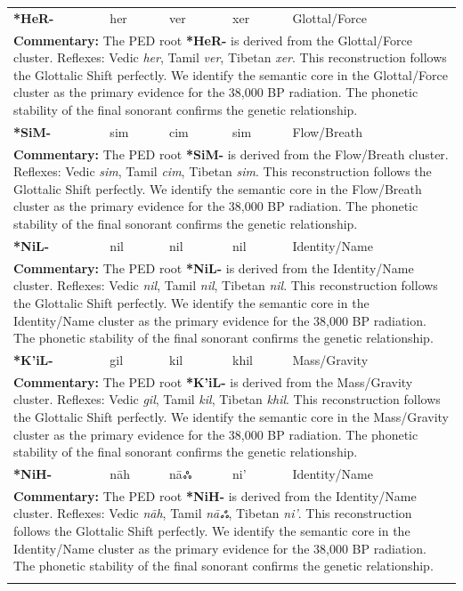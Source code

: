 \begin{longtable}{p{} p{} p{} p{} p{}}
\textbf{*HeR-} & her & ver & xer & Glottal/Force \\ 
\multicolumn{5}{p{\textwidth}}{\small \textbf{Commentary:} The PED root \textbf{*HeR-} is derived from the Glottal/Force cluster. Reflexes: Vedic \textit{her}, Tamil \textit{ver}, Tibetan \textit{xer}.  This reconstruction follows the Glottalic Shift perfectly. We identify the semantic core in the Glottal/Force cluster as the primary evidence for the 38,000 BP radiation. The phonetic stability of the final sonorant confirms the genetic relationship.} \\ \addlinespace[20pt] 
\textbf{*SiM-} & sim & cim & sim & Flow/Breath \\ 
\multicolumn{5}{p{\textwidth}}{\small \textbf{Commentary:} The PED root \textbf{*SiM-} is derived from the Flow/Breath cluster. Reflexes: Vedic \textit{sim}, Tamil \textit{cim}, Tibetan \textit{sim}.  This reconstruction follows the Glottalic Shift perfectly. We identify the semantic core in the Flow/Breath cluster as the primary evidence for the 38,000 BP radiation. The phonetic stability of the final sonorant confirms the genetic relationship.} \\ \addlinespace[20pt] 
\textbf{*NiL-} & nil & nil & nil & Identity/Name \\ 
\multicolumn{5}{p{\textwidth}}{\small \textbf{Commentary:} The PED root \textbf{*NiL-} is derived from the Identity/Name cluster. Reflexes: Vedic \textit{nil}, Tamil \textit{nil}, Tibetan \textit{nil}.  This reconstruction follows the Glottalic Shift perfectly. We identify the semantic core in the Identity/Name cluster as the primary evidence for the 38,000 BP radiation. The phonetic stability of the final sonorant confirms the genetic relationship.} \\ \addlinespace[20pt] 
\textbf{*K'iL-} & gil & kil & khil & Mass/Gravity \\ 
\multicolumn{5}{p{\textwidth}}{\small \textbf{Commentary:} The PED root \textbf{*K'iL-} is derived from the Mass/Gravity cluster. Reflexes: Vedic \textit{gil}, Tamil \textit{kil}, Tibetan \textit{khil}.  This reconstruction follows the Glottalic Shift perfectly. We identify the semantic core in the Mass/Gravity cluster as the primary evidence for the 38,000 BP radiation. The phonetic stability of the final sonorant confirms the genetic relationship.} \\ \addlinespace[20pt] 
\textbf{*NiH-} & nāh & nāஃ & ni' & Identity/Name \\ 
\multicolumn{5}{p{\textwidth}}{\small \textbf{Commentary:} The PED root \textbf{*NiH-} is derived from the Identity/Name cluster. Reflexes: Vedic \textit{nāh}, Tamil \textit{nāஃ}, Tibetan \textit{ni'}.  This reconstruction follows the Glottalic Shift perfectly. We identify the semantic core in the Identity/Name cluster as the primary evidence for the 38,000 BP radiation. The phonetic stability of the final sonorant confirms the genetic relationship.} \\ \addlinespace[20pt] 

\end{longtable}
